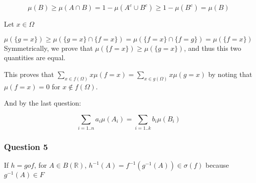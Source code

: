 \documentclass[12pt]{article}
\newcommand{\Q}[1]{\subsubsection*{Question #1}}
\newcommand{\union}[1]{\underset{#1}{\cup} }
\newcommand{\inter}[1]{\underset{#1}{\cap} }
\begin{document}
\begin{itemize}
$$\mu(B) \geq \mu(A \inter{} B) = 1 - \mu(A^c \union{} B^c) \geq 1 - \mu(B^c) = \mu(B)$$


Let $x \in \Omega$ 

$\mu(\{g = x\}) \geq \mu(\{g = x\} \inter{} \{f=x\}) = \mu(\{f = x\} \inter{} \{f=g\}) = \mu(\{f = x\})$ 
Symmetrically, we prove that $\mu(\{f = x\}) \geq \mu(\{g = x\})$, and thus this two quantities are equal.

This proves that $\sum_{x \in f(\Omega)} x \mu(f = x) = \sum_{x \in g(\Omega)} x \mu(g = x)$ by noting that $\mu(f = x) = 0$ for $x \not \in f(\Omega)$.

And by the last question:

$$\sum_{i=1..n} a_i \mu(A_i) = \sum_{i=1..k} b_i \mu(B_i)$$

\end{itemize}

\newpage

\Q{5} 

If $h = gof$, for $A \in B(\mathbb{R})$, $h^{-1}(A) = f^{-1} (g^{-1}(A)) \in \sigma(f)$ because $g^{-1}(A) \in F$
\end{document}
